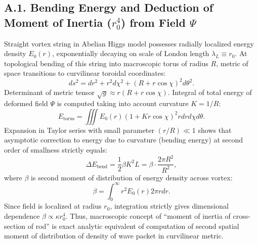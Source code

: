 \documentclass[12pt,a4paper]{article}
\begin{document}
\subsection{A.1. Bending Energy and Deduction of Moment of Inertia ($r_0^4$) from Field $\Psi$}
Straight vortex string in Abelian Higgs model possesses radially localized energy density $E_0(r)$, exponentially decaying on scale of London length $\lambda_L \equiv r_0$. At topological bending of this string into macroscopic torus of radius $R$, metric of space transitions to curvilinear toroidal coordinates:
\begin{equation}
    ds^2 = dr^2 + r^2 d\chi^2 + (R+r\cos\chi)^2 d\theta^2.
    \label{eq:torus_metric}
\end{equation}
Determinant of metric tensor $\sqrt{g} \approx r(R+r\cos\chi)$. Integral of total energy of deformed field $\Psi$ is computed taking into account curvature $K=1/R$:
\begin{equation}
    E_{\text{torus}} = \iiint E_0(r) (1+Kr\cos\chi)^2 r dr d\chi d\theta.
    \label{eq:energy_torus_integral}
\end{equation}
Expansion in Taylor series with small parameter $(r/R) \ll 1$ shows that asymptotic correction to energy due to curvature (bending energy) at second order of smallness strictly equals:
\begin{equation}
    \Delta E_{\text{bend}} = \frac{1}{2}\beta K^2 L = \beta \cdot \frac{2\pi R^2}{R^2},
    \label{eq:bending_energy_torus}
\end{equation}
where $\beta$ is second moment of distribution of energy density across vortex:
\begin{equation}
    \beta = \int_0^\infty r^2 E_0(r) 2\pi r dr.
    \label{eq:bending_moment}
\end{equation}
Since field is localized at radius $r_0$, integration strictly gives dimensional dependence $\beta \propto \kappa r_0^4$. Thus, macroscopic concept of ``moment of inertia of cross-section of rod'' is exact analytic equivalent of computation of second spatial moment of distribution of density of wave packet in curvilinear metric.
\end{document}
